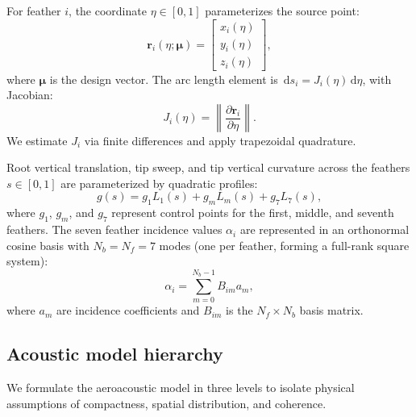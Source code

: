 \documentclass[11pt]{article}
\newcommand{\dd}{\,\mathrm{d}}
\newcommand{\vect}[1]{\bm{#1}}
\begin{document}
For feather $i$, the coordinate $\eta \in [0, 1]$ parameterizes the source point:
\begin{equation}
    \vect{r}_i(\eta;\vect{\mu}) =
    \begin{bmatrix}
    x_i(\eta)\\
    y_i(\eta)\\
    z_i(\eta)
    \end{bmatrix},
\label{eq:source_position}
\end{equation}
where $\vect{\mu}$ is the design vector. The arc length element is $\dd s_i = J_i(\eta)\dd\eta$, with Jacobian:
\begin{equation}
    J_i(\eta)=
    \left\|
        \frac{\partial\vect{r}_i}{\partial\eta}
    \right\|.
\end{equation}
We estimate $J_i$ via finite differences and apply trapezoidal quadrature. 

Root vertical translation, tip sweep, and tip vertical curvature across the feathers $s \in [0, 1]$ are parameterized by quadratic profiles:
\begin{equation}
    g(s)=g_1L_1(s)+g_mL_m(s)+g_7L_7(s),
\end{equation}
where $g_1$, $g_m$, and $g_7$ represent control points for the first, middle, and seventh feathers. The seven feather incidence values $\alpha_i$ are represented in an orthonormal cosine basis with $N_b = N_f = 7$ modes (one per feather, forming a full-rank square system):
\begin{equation}
    \alpha_i =
    \sum_{m=0}^{N_b-1}
    B_{im}a_m,
\label{eq:incidence_basis}
\end{equation}
where $a_m$ are incidence coefficients and $B_{im}$ is the $N_f \times N_b$ basis matrix.

\subsection{Acoustic model hierarchy}

We formulate the aeroacoustic model in three levels to isolate physical assumptions of compactness, spatial distribution, and coherence.
\end{document}
